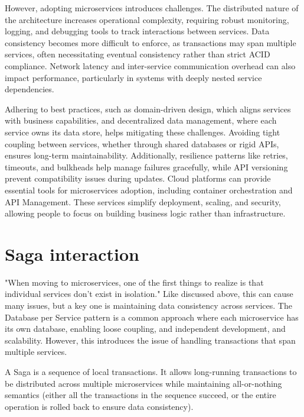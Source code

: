 \documentclass[]{final}
\begin{document}
However, adopting microservices introduces challenges. The distributed nature
of the architecture increases operational complexity, requiring robust
monitoring, logging, and debugging tools to track interactions between
services. Data consistency becomes more difficult to enforce, as transactions
may span multiple services, often necessitating eventual consistency rather
than strict ACID compliance. Network latency and inter-service communication
overhead can also impact performance, particularly in systems with
deeply nested service dependencies.

Adhering to best practices, such as domain-driven design, which aligns services
with business capabilities, and decentralized data management, where each
service owns its data store, helps mitigating these challenges. Avoiding
tight coupling between services, whether through shared databases or rigid
APIs, ensures long-term maintainability. Additionally, resilience patterns
like retries, timeouts, and bulkheads help manage failures gracefully,
while API versioning prevent compatibility issues during updates.
Cloud platforms can provide essential tools for microservices adoption,
including container orchestration and API Management. These services simplify
deployment, scaling, and security, allowing people to focus on building
business logic rather than infrastructure.

\section{Saga interaction}

"When moving to microservices, one of the first things to
realize is that individual services don’t exist in isolation." %
Like discussed above, this can cause many issues, but a key one
is maintaining data
consistency across services. The Database per Service pattern is a common
approach where each microservice has its own database, enabling loose coupling,
and independent development, and scalability. However, this introduces the
issue of handling transactions that span multiple services.

A Saga is a sequence of local transactions. %
It allows long-running transactions to be distributed across multiple
microservices while maintaining all-or-nothing semantics
(either all the transactions in the sequence succeed, or the entire operation
is rolled back to ensure data consistency).
\end{document}
